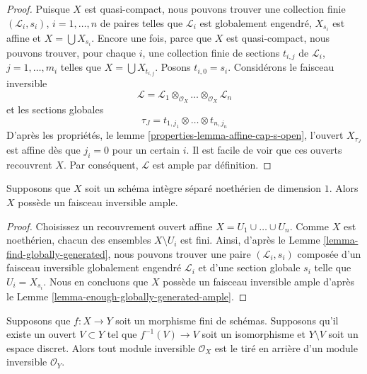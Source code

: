 \begin{proof}
Puisque $X$ est quasi-compact, nous pouvons trouver une
collection finie $(\mathcal{L}_i, s_i)$, $i = 1, \ldots, n$ de
paires telles que $\mathcal{L}_i$ est globalement engendré,
$X_{s_i}$ est affine et $X = \bigcup X_{s_i}$. Encore une fois,
parce que $X$ est quasi-compact, nous pouvons trouver, pour
chaque $i$, une collection finie de sections $t_{i, j}$ de
$\mathcal{L}_i$, $j = 1, \ldots, m_i$ telles que $X = \bigcup
X_{t_{i, j}}$. Posons $t_{i, 0} = s_i$. Considérons le faisceau inversible
$$
\mathcal{L} = \mathcal{L}_1 
\otimes_{\mathcal{O}_X} \ldots
\otimes_{\mathcal{O}_X} \mathcal{L}_n
$$
et les sections globales
$$
\tau_J = t_{1, j_1} \otimes \ldots \otimes t_{n, j_n}
$$
D'après les propriétés, le lemme
\ref{properties-lemma-affine-cap-s-open}, l'ouvert $X_{\tau_J}$ est affine
dès que $j_i = 0$ pour un certain $i$. Il est facile de voir que ces
ouverts recouvrent $X$. Par conséquent, $\mathcal{L}$ est ample par définition.
\end{proof}

\begin{lemma}
\label{lemma-dim-1-noetherian-integral-separated-has-ample}
Supposons que $X$ soit un schéma intègre séparé noethérien de
dimension $1$. Alors $X$ possède un faisceau inversible ample.
\end{lemma}

\begin{proof}
Choisissez un recouvrement ouvert affine $X = U_1 \cup \ldots
\cup U_n$. Comme $X$ est noethérien, chacun des ensembles $X
\setminus U_i$ est fini. Ainsi, d'après le Lemme
\ref{lemma-find-globally-generated}, nous pouvons trouver une paire
$(\mathcal{L}_i, s_i)$ composée d'un faisceau inversible globalement
engendré $\mathcal{L}_i$ et d'une section globale $s_i$ telle que
$U_i = X_{s_i}$. Nous en concluons que $X$ possède un faisceau
inversible ample d'après le Lemme \ref{lemma-enough-globally-generated-ample}.
\end{proof}

\begin{lemma}
\label{lemma-surjective-pic-birational-finite}
Supposons que $f : X \to Y$ soit un morphisme fini de
schémas. Supposons qu'il existe un ouvert $V \subset Y$ tel que
$f^{-1}(V) \to V$ soit un isomorphisme et $Y \setminus V$ soit
un espace discret. Alors tout module inversible $\mathcal{O}_X$
est le tiré en arrière d'un module inversible $\mathcal{O}_Y$.
\end{lemma}

